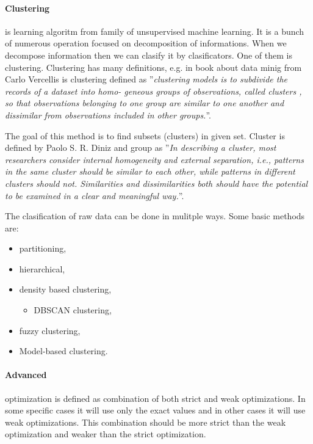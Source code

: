 	\paragraph{Clustering} is learning algoritm from family of unsupervised machine learning. It is
	a bunch of numerous operation focused on decomposition of informations.
	When we decompose information then we can clasify it by clasificators.
	One of them is clustering. Clustering has many definitions, e.g.
	 in book about data minig from Carlo Vercellis is clustering defined as
	''\emph{clustering models is to subdivide the records of a dataset into homo-
	geneous groups of observations, called clusters , so that observations belonging
	to one group are similar to one another and dissimilar from observations
	included in other groups.}''. \cite{doi:10.1002/9780470753866.ch12}

	The goal of this method is to find subsets (clusters) in given set.
	Cluster is defined by Paolo S. R. Diniz and group as ''\emph{In describing a cluster,
	most researchers consider internal homogeneity and external separation,
	i.e., patterns in the same cluster should be similar to each other, while patterns in different
	clusters should not. Similarities and dissimilarities both should have the potential to be examined in a
	clear and meaningful way.}''. \cite{Lam20141115}

	The clasification of raw data can be done in mulitple ways.
	Some basic methods are:
	\begin{itemize}
		\item partitioning,
		\item hierarchical,
		\item density based clustering,
		\begin{itemize}
			\item DBSCAN clustering,
		\end{itemize}
		\item fuzzy clustering,
		\item Model-based clustering.
	\end{itemize}

	\paragraph{Advanced}
	optimization is defined as combination of both strict and weak optimizations.
	In some specific cases it will use only the exact values and in other cases it will use weak optimizations.
	This combination should be more strict than the weak optimization and weaker than the strict optimization.

